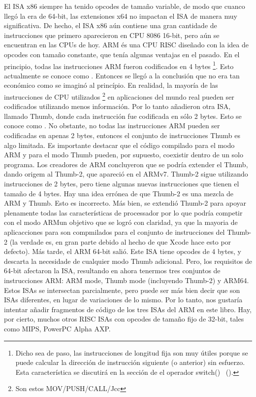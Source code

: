 El \ac{ISA} x86 siempre ha tenido opcodes de tamaño variable, de modo que cuanco llegó la era de 64-bit, las extensiones x64 no impactan el \ac{ISA} de manera muy significativa. De hecho, el \ac{ISA} x86 aún contiene una gran cantidade de instrucciones que primero aparecieron en CPU 8086 16-bit, pero aún se encuentran en las CPUs de hoy.
ARM és una \ac{CPU} \ac{RISC} diseñado con la idea de opcodes con tamaño constante, que tenía algunas ventajas en el pasado.
En el principio, todas las instrucciones ARM fueron codificados en 4 bytes%
\footnote{Dicho sea de paso, las instrucciones de longitud fija son muy útiles porque se puede calcular la dirección de instrucción siguiente (o anterior) sin esfuerzo. Esta característica se discutirá en la sección de el operador switch() ~().}.
Esto actualmente se conoce como .
Entonces se llegó a la conclusión que no era tan económico como se imaginó al princípio.
En realidad, la mayoría de las instrucciones de \ac{CPU} utilizados \footnote{Son estos MOV/PUSH/CALL/Jcc} en aplicaciones del mundo real pueden ser codificados utilizando menos información.
Por lo tanto añadieron otra \ac{ISA}, llamado Thumb, donde cada instrucción fue codificada en sólo 2 bytes.
Esto se conoce como .
No obstante, no todas las instrucciones ARM pueden ser codificadas en apenas 2 bytes, entonces el conjunto de instrucciones Thumb es algo limitada.
Es importante destacar que el código compilado para el modo ARM y para el modo Thumb pueden, por supuesto, coexistir dentro de un solo programa.
Los creadores de ARM concluyeron que se podría extender el Thumb, dando origem al Thumb-2, que apareció en el ARMv7.
Thumb-2 sigue utilizando instrucciones de 2 bytes, pero tiene algunas nuevas instrucciones que tienen el tamaño de 4 bytes.
Hay una idea errónea de que Thumb-2 es una mezcla de ARM y Thumb. Esto es incorrecto. 
Más bien, se extendió Thumb-2 para apoyar plenamente todas las características de processador por lo que podría 
competir con el modo ARM\EMDASH{}un objetivo que se logró con claridad, ya que la mayoria de aplicacciones para \idevices son compmilados para el conjunto de instrucciones del Thumb-2 (la verdade es, en gran parte debido al hecho de que Xcode hace esto por defecto).
Más tarde, el ARM 64-bit salió. Este \ac{ISA} tiene opcodes de 4 bytes, y descarta la necesidade de cualquier modo Thumb adicional.
Pero, los requisitos de 64-bit afectaron la \ac{ISA}, resultando en ahora tenermos tres conjuntos de instrucciones ARM: ARM mode, Thumb mode (incluyendo Thumb-2) y ARM64.
Estos \ac{ISA}s se intersectan parcialmente, pero puede ser más bien decir que son \ac{ISA}s diferentes, en lugar de variaciones de lo mismo.
Por lo tanto, nos gustaría intentar añadir fragmentos de código de los tres \ac{ISA}s del ARM en este libro.
%
%
%
Hay, por cierto, muchos otros \ac{RISC} \ac{ISA}s con opcodes de tamaño fijo de 32-bit, tales como MIPS, PowerPC \ESph{} Alpha AXP.
